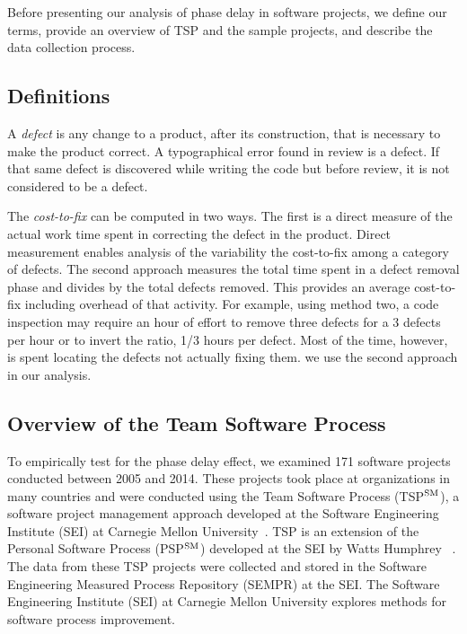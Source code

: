 Before presenting our analysis of phase delay in software projects, we define our terms, provide an overview of TSP and the sample projects, and describe the data collection process.

\subsection{Definitions}
A \emph{defect} is any change to a product, after its construction, that is necessary to make the product correct.  A typographical error found in review is a defect. If that same defect is discovered while writing the code but before review, it is not considered to be a defect. 

The \emph{cost-to-fix} can be computed in two ways. The first is a direct measure of the actual work time spent in correcting the defect in the product. Direct measurement enables analysis of the variability the cost-to-fix among a category of defects. The second approach measures the total time spent in a defect removal phase and divides by the total defects removed. This provides an average cost-to-fix including overhead of that activity. For example, using method two, a code inspection may require an hour of effort to remove three defects for a 3 defects per hour or to invert the ratio, 1/3 hours per defect. Most of the time, however, is spent locating the defects not actually fixing them. we use the second approach in our analysis.


\subsection{Overview of the Team Software Process}
To empirically test for the phase delay effect, we examined 171 software projects conducted between 2005 and 2014. These projects took place at organizations in many countries and were conducted using  the Team Software Process (TSP$\textsuperscript{SM}$), a software project management approach developed at the Software Engineering Institute (SEI) at Carnegie Mellon University~\cite{tsp00}. TSP is an extension of the Personal Software Process (PSP$\textsuperscript{SM}$) developed at the SEI by Watts Humphrey ~\cite{tsp00}. The data from these TSP projects were collected and stored in the Software Engineering Measured Process Repository (SEMPR) at the SEI. The Software Engineering Institute (SEI) at Carnegie Mellon University explores methods for software process improvement.
 



